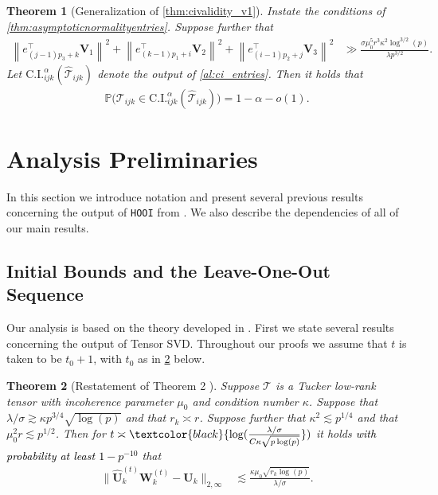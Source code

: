 \documentclass[10pt]{article}
\newcommand{\0}{{\mathbf{0}}}
\newcommand{\1}{{\mathbf{1}}}
\newcommand{\U}{{\mathbf{U}}}
\renewcommand{\citet}{\cite}
\renewcommand{\t}{^{\top}}
\newcommand{\uhat}{\mathbf{\hat{U}}}
\newtheorem{theorem}{Theorem}
\newcommand{\p}{\mathbb{P}}
\renewcommand{\hat}{\widehat}
\renewcommand{\hat}{\widehat}
\begin{document}
\begin{theorem}[Generalization of \cref{thm:civalidity_v1}] \label{thm:civalidity}
Instate the conditions of \cref{thm:asymptoticnormalityentries}.  Suppose further that 
\begin{align*}
\left\|e_{(j-1) p_{3}+k}^{\top} \mathbf{V}_{1}\right\|^{2}+\left\|e_{(k-1) p_{1}+i}\t \mathbf{V}_{2}\right\|^{2}+\left\|e_{(i-1) p_{2}+j}\t \mathbf{V}_{3}\right\|^{2} &\gg  \frac{\sigma \mu_0^5 r^3 \kappa^2 \log^{3/2}(p)}{\lambda p^{3/2}}.
\end{align*}
 Let $\mathrm{C.I.}^{\alpha}_{ijk}(\mathcal{\hat T}_{ijk})$ denote the output of \cref{al:ci_entries}.  Then it holds that
\begin{align*}
    \p\bigg( \mathcal{T}_{ijk} \in  \mathrm{C.I.}^{\alpha}_{ijk}(\mathcal{\hat T}_{ijk}) \bigg) = 1- \alpha  - o(1).
\end{align*}
\end{theorem}


\section{Analysis Preliminaries} 
\label{sec:analysispreliminaries}
In this section we introduce notation and present several previous results concerning the output of \texttt{HOOI} from \citet{agterberg_estimating_2022}.    We also describe the dependencies of all of our main results.  




\subsection{Initial Bounds and the Leave-One-Out Sequence} \label{sec:leaveoneout}

Our analysis is based on the theory developed in \citet{agterberg_entrywise_2022}.  First we state several results concerning the output of Tensor SVD.   Throughout our proofs we assume that $t$ is taken to be $t_0 + 1$, with $t_0$ as in \cref{thm:twoinfty} below.    
\begin{theorem}[Restatement of Theorem 2 \citet{agterberg_entrywise_2022}] \label{thm:twoinfty}
Suppose $\mathcal{T}$ is a Tucker low-rank tensor with incoherence parameter $\mu_0$ and condition number $\kappa$.  Suppose that $\lambda/\sigma \gtrsim \kappa p^{3/4} \sqrt{\log(p)}$ and that $r_k \asymp r$.  Suppose further that $\kappa^2 \lesssim p^{1/4}$ and that $\mu_0^2 r \lesssim p^{1/2}$.  Then  for $t\asymp \textcolor{black}{\log( \frac{\lambda/\sigma}{C \kappa \sqrt{p\log(p)}}})$ %
it holds \textcolor{black}{with probability at least $1 - p^{-10}$} that
\begin{align*}
    \| \uhat_k^{(t)} \mathbf{W}_k^{(t)} - \U_k \|_{2,\infty} &\lesssim \frac{ \kappa\mu_0 \sqrt{r_k \log(p)}}{\lambda/\sigma}.
\end{align*}
\end{theorem}
\end{document}
